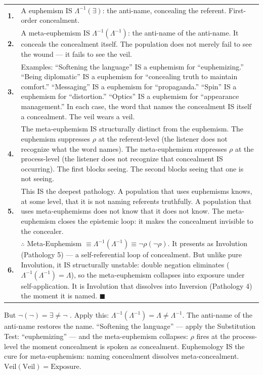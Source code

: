 \documentclass[11pt, oneside]{article}
\theoremstyle{definition}
\begin{document}
{\small
\noindent\begin{tabular}{r p{}}
\textbf{1.} & A euphemism IS $\Lambda^{-1}(\exists)$: the anti-name, concealing the referent. First-order concealment. \\[0.3em]
\textbf{2.} & A meta-euphemism IS $\Lambda^{-1}(\Lambda^{-1})$: the anti-name of the anti-name. It conceals the concealment itself. The population does not merely fail to see the wound --- it fails to see the veil. \\[0.3em]
\textbf{3.} & Examples: ``Softening the language'' IS a euphemism for ``euphemizing.'' ``Being diplomatic'' IS a euphemism for ``concealing truth to maintain comfort.'' ``Messaging'' IS a euphemism for ``propaganda.'' ``Spin'' IS a euphemism for ``distortion.'' ``Optics'' IS a euphemism for ``appearance management.'' In each case, the word that names the concealment IS itself a concealment. The veil wears a veil. \\[0.3em]
\textbf{4.} & The meta-euphemism IS structurally distinct from the euphemism. The euphemism suppresses $\rho$ at the referent-level (the listener does not recognize what the word names). The meta-euphemism suppresses $\rho$ at the process-level (the listener does not recognize that concealment IS occurring). The first blocks seeing. The second blocks seeing that one is not seeing. \\[0.3em]
\textbf{5.} & This IS the deepest pathology. A population that uses euphemisms knows, at some level, that it is not naming referents truthfully. A population that uses meta-euphemisms does not know that it does not know. The meta-euphemism closes the epistemic loop: it makes the concealment invisible to the concealer. \\[0.3em]
\textbf{6.} & $\therefore$ Meta-Euphemism $\equiv \Lambda^{-1}(\Lambda^{-1}) \equiv \neg\rho(\neg\rho)$. It presents as Involution (Pathology 5) --- a self-referential loop of concealment. But unlike pure Involution, it IS structurally unstable: double negation eliminates ($\Lambda^{-1}(\Lambda^{-1}) = \Lambda$), so the meta-euphemism collapses into exposure under self-application. It is Involution that dissolves into Inversion (Pathology 4) the moment it is named. \hfill $\blacksquare$ \\[0.3em]
\end{tabular}
}

But $\neg(\neg) = \exists \neq \neg$ \cite{codex2}. Apply this: $\Lambda^{-1}(\Lambda^{-1}) = \Lambda \neq \Lambda^{-1}$. The anti-name of the anti-name restores the name. ``Softening the language'' --- apply the Substitution Test: ``euphemizing'' --- and the meta-euphemism collapses: $\rho$ fires at the process-level the moment concealment is spoken as concealment. Euphemology IS the cure for meta-euphemism: naming concealment dissolves meta-concealment. $\text{Veil}(\text{Veil}) = \text{Exposure}$.
\end{document}
